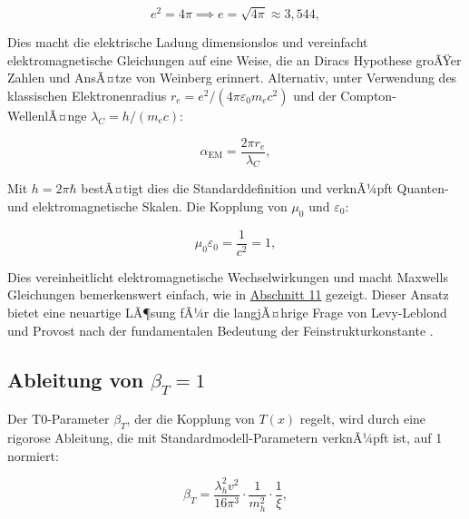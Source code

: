 ﻿\documentclass[twocolumn,aps,prl]{revtex4-2}
\begin{document}
{{{{{{{{{										\begin{equation}
											e^2 = 4 \pi \implies e = \sqrt{4 \pi} \approx 3{,}544, \label{eq:charge_value}
										\end{equation}
										
										Dies macht die elektrische Ladung dimensionslos und vereinfacht elektromagnetische Gleichungen auf eine Weise, die an Diracs Hypothese groÃŸer Zahlen \cite{Dirac1937} und AnsÃ¤tze von Weinberg \cite{Weinberg1983} erinnert. Alternativ, unter Verwendung des klassischen Elektronenradius \(r_e = e^2/(4 \pi \varepsilon_0 m_e c^2)\) und der Compton-WellenlÃ¤nge \(\lambda_C = h/(m_e c)\):
										
										\begin{equation}
											\alpha_{\text{EM}} = \frac{2 \pi r_e}{\lambda_C}, \label{eq:alpha_alt}
										\end{equation}
										
										Mit \(h = 2 \pi \hbar\) bestÃ¤tigt dies die Standarddefinition und verknÃ¼pft Quanten- und elektromagnetische Skalen. Die Kopplung von \(\mu_0\) und \(\varepsilon_0\):
										
										\begin{equation}
											\mu_0 \varepsilon_0 = \frac{1}{c^2} = 1, \label{eq:em_coupling}
										\end{equation}
										
										Dies vereinheitlicht elektromagnetische Wechselwirkungen und macht Maxwells Gleichungen bemerkenswert einfach, wie in \hyperref[subsec:detailed_em_constants]{Abschnitt 11} gezeigt. Dieser Ansatz bietet eine neuartige LÃ¶sung fÃ¼r die langjÃ¤hrige Frage von Levy-Leblond und Provost nach der fundamentalen Bedeutung der Feinstrukturkonstante \cite{LevyLeblond1979}.
										
										\subsection{Ableitung von \(\beta_T = 1\)}
										\label{subsec:beta_derivation}
										
										Der T0-Parameter \(\beta_T\), der die Kopplung von \(T(x)\) regelt, wird durch eine rigorose Ableitung, die mit Standardmodell-Parametern verknÃ¼pft ist, auf 1 normiert:
										
										\begin{equation}
											\beta_T = \frac{\lambda_h^2 v^2}{16 \pi^3} \cdot \frac{1}{m_h^2} \cdot \frac{1}{\xi}, \label{eq:beta_derivation}
										\end{equation}
										
}}}}}}}}}
\end{document}
